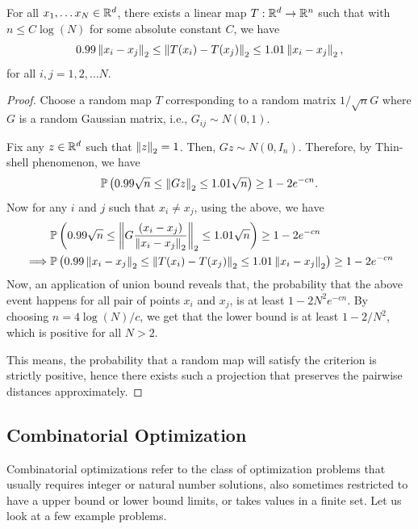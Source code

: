 \documentclass[12pt]{article}
\begin{document}
\begin{theorembox}
    For all $x_1, \dots x_N \in \mathbb{R}^d$, there exists a linear map $T: \mathbb{R}^d \rightarrow \mathbb{R}^n$ such that with $n \leq C\log(N)$ for some absolute constant $C$, we have 
    \begin{equation*}
        0.99 \left\Vert x_i - x_j \right\Vert_2 \leq \left\Vert T(x_i) - T(x_j) \right\Vert_2 \leq 1.01 \left\Vert x_i - x_j \right\Vert_2,
    \end{equation*}
    \noindent for all $i, j = 1, 2, \dots N$. 
\end{theorembox}

\begin{proof}
    Choose a random map $T$ corresponding to a random matrix $1/\sqrt{n}G$ where $G$ is a random Gaussian matrix, i.e., $G_{ij} \sim N(0, 1)$. 

    Fix any $z \in \mathbb{R}^d$ such that $\left\Vert z \right\Vert_2 = 1$. Then, $Gz \sim N(0, I_n)$. Therefore, by Thin-shell phenomenon, we have 
    \begin{equation*}
        \mathbb{P}\left( 0.99\sqrt{n} \leq \left\Vert Gz \right\Vert_2 \leq 1.01 \sqrt{n} \right) \geq 1 - 2e^{-cn}.
    \end{equation*}
    \noindent Now for any $i$ and $j$ such that $x_i \neq x_j$, using the above, we have 
    \begin{align*}
        & \mathbb{P}\left( 0.99\sqrt{n} \leq \left\Vert G\dfrac{(x_i - x_j)}{ \left\Vert x_i - x_j \right\Vert_2 }  \right\Vert_2 \leq 1.01 \sqrt{n} \right) \geq 1 - 2e^{-cn}\\
        \implies & \mathbb{P}\left( 0.99\left\Vert x_i - x_j \right\Vert_2 \leq \left\Vert T(x_i) - T(x_j) \right\Vert_2 \leq 1.01 \left\Vert x_i - x_j \right\Vert_2 \right) \geq 1 - 2e^{-cn}
    \end{align*}
    \noindent Now, an application of union bound reveals that, the probability that the above event happens for all pair of points $x_i$ and $x_j$, is at least $1 - 2N^2 e^{-cn}$. By choosing $n = 4\log(N)/c$, we get that the lower bound is at least $1 - 2/N^2$, which is positive for all $N > 2$. 

    This means, the probability that a random map will satisfy the criterion is strictly positive, hence there exists such a projection that preserves the pairwise distances approximately.
\end{proof}

\subsection{Combinatorial Optimization}

Combinatorial optimizations refer to the class of optimization problems that usually requires integer or natural number solutions, also sometimes restricted to have a upper bound or lower bound limits, or takes values in a finite set. Let us look at a few example problems.
\end{document}

